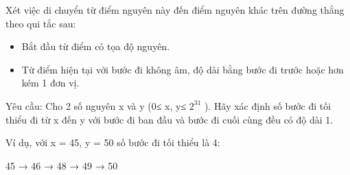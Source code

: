 Xét việc di chuyển từ điểm nguyên này đến điểm nguyên khác trên đường thẳng theo qui tắc sau:  
\begin{itemize}
	\item     Bắt đầu từ điểm có tọa độ nguyên.   
	\item     Từ điểm hiện tại với bước đi không âm, độ dài bằng bước đi trước hoặc hơn kém 1 đơn vị.   
\end{itemize}

   Yêu cầu: Cho 2 số nguyên x và y (0≤ x, y≤ $2^{31}$   ). Hãy xác định số bước đi tối thiểu đi từ x đến y với   bước đi ban đầu và bước đi cuối cùng đều có độ dài 1.  

   Ví dụ, với x = 45, y = 50 số bước đi tối thiểu là 4:  

   45 → 46 → 48 → 49 → 50